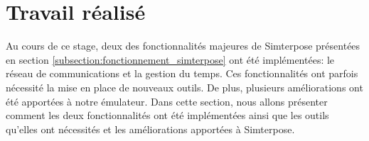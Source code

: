 \section{Travail réalisé}
\label{section:work}
Au cours de ce stage, deux des fonctionnalités majeures de Simterpose présentées en section \ref{subsection:fonctionnement_simterpose} ont été implémentées: le réseau de communications et la gestion du temps. Ces fonctionnalités ont parfois nécessité la mise en place de nouveaux outils. De plus, plusieurs améliorations ont été apportées à notre émulateur. Dans cette section, nous allons présenter comment les deux fonctionnalités ont été implémentées ainsi que les outils qu'elles ont nécessités et les améliorations apportées à Simterpose.



